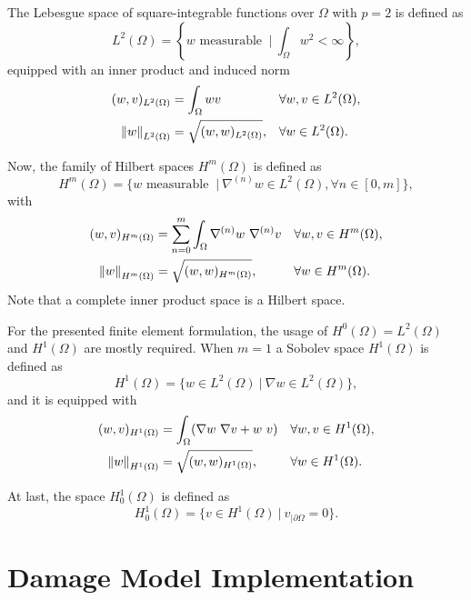 The Lebesgue space of square-integrable functions over $\Omega$ with $p=2$ is defined as
\begin{equation}
	L^2(\Omega) = \left \{ {w \text{ measurable } \ | \ \int_{\Omega} w^2  < \infty} \right \},
\end{equation}
equipped with an inner product and induced norm
\begin{align}
	(w,v)_{L^2(\Omega)}    & = \int_{\Omega} w v           &  & \forall w,v \in L^2(\Omega), \\
	\left\lVert w \right\rVert_{L^2(\Omega)} & = \sqrt{(w,w)_{L^2(\Omega)}}, &  & \forall w \in L^2(\Omega).
\end{align}

Now, the family of Hilbert spaces $H^m(\Omega)$ is defined as
\begin{equation}
	H^m(\Omega) = \{ w \text{ measurable } \ | \ \nabla^{(n)}{w} \in L^2(\Omega), \forall n \in [0,m] \},
\end{equation}
with
\begin{align}
	(w,v)_{H^m(\Omega)}    & = \sum_{n=0}^{m} \int_{\Omega} \nabla^{(n)}{w} \ \nabla^{(n)}{v} &  & \forall w,v \in H^m(\Omega), \\
	\left\lVert w \right\rVert_{H^m(\Omega)} & = \sqrt{(w,w)_{H^m(\Omega)}},                                    &  & \forall w \in H^m(\Omega).
\end{align}
Note that a complete inner product space is a Hilbert space.

For the presented finite element formulation, the usage of $H^0(\Omega)=L^2(\Omega)$ and $H^1(\Omega)$ are mostly required. When $m=1$ a Sobolev space $H^1(\Omega)$ is defined as
\begin{equation}
	H^1(\Omega) = \{ w \in L^2(\Omega) \ | \ \nabla{w} \in L^2(\Omega) \},
\end{equation}
and it is equipped with
\begin{align}
	(w,v)_{H^1(\Omega)}    & = \int_{\Omega} (\nabla{w} \ \nabla{v} + w \ v) &  & \forall w,v \in H^1(\Omega), \\
	\left\lVert w \right\rVert_{H^1(\Omega)} & = \sqrt{(w,w)_{H^1(\Omega)}},                   &  & \forall w \in H^1(\Omega).
\end{align}

At last, the space $H^1_0(\Omega)$ is defined as
\begin{equation}
	H^1_0(\Omega) = \{ v\in H^1(\Omega) \ | \ v_{|\partial\Omega}=0 \}.
\end{equation}

\section{Damage Model Implementation}
\label{sec_return_mapping}

